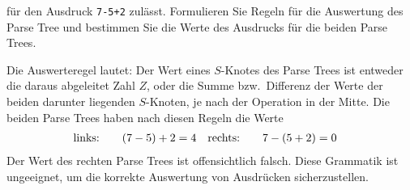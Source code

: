 für den Ausdruck \texttt{7-5+2} zulässt.
Formulieren Sie Regeln für die Auswertung des Parse Tree und bestimmen
Sie die Werte des Ausdrucks für die beiden Parse Trees.


\begin{loesung}
Die Auswerteregel lautet:
Der Wert eines $S$-Knotes des Parse Trees ist entweder die daraus
abgeleitet Zahl $Z$, oder die Summe bzw.~Differenz der Werte der beiden
darunter liegenden $S$-Knoten, je nach der Operation in der Mitte.
Die beiden Parse Trees haben nach diesen Regeln die Werte
\begin{align*}
\text{links:\qquad}&(7-5)+2=4
&
\text{rechts:\qquad}&7-(5+2)=0
\end{align*}
Der Wert des rechten Parse Trees ist offensichtlich falsch.
Diese Grammatik ist ungeeignet, um die korrekte Auswertung
von Ausdrücken sicherzustellen.
\end{loesung}


